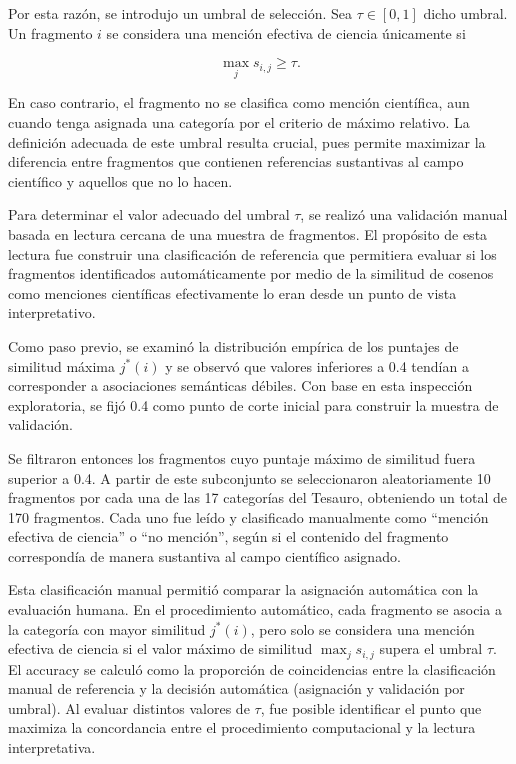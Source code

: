 \documentclass[11pt,a4paper]{article}
\begin{document}
Por esta razón, se introdujo un umbral de selección. Sea $\tau \in [0,1]$ dicho umbral. Un fragmento $i$ se considera una mención efectiva de ciencia únicamente si

\[
\max_{j} s_{i,j} \geq \tau.
\]

En caso contrario, el fragmento no se clasifica como mención científica, aun cuando tenga asignada una categoría por el criterio de máximo relativo. La definición adecuada de este umbral resulta crucial, pues permite maximizar la diferencia entre fragmentos que contienen referencias sustantivas al campo científico y aquellos que no lo hacen.

Para determinar el valor adecuado del umbral $\tau$, se realizó una validación manual basada en lectura cercana de una muestra de fragmentos. El propósito de esta lectura fue construir una clasificación de referencia que permitiera evaluar si los fragmentos identificados automáticamente por medio de la similitud de cosenos como menciones científicas efectivamente lo eran desde un punto de vista interpretativo.

Como paso previo, se examinó la distribución empírica de los puntajes de similitud máxima $j^*(i)$ y se observó que valores inferiores a 0.4 tendían a corresponder a asociaciones semánticas débiles. Con base en esta inspección exploratoria, se fijó 0.4 como punto de corte inicial para construir la muestra de validación.

Se filtraron entonces los fragmentos cuyo puntaje máximo de similitud fuera superior a 0.4. A partir de este subconjunto se seleccionaron aleatoriamente 10 fragmentos por cada una de las 17 categorías del Tesauro, obteniendo un total de 170 fragmentos. Cada uno fue leído y clasificado manualmente como “mención efectiva de ciencia” o “no mención”, según si el contenido del fragmento correspondía de manera sustantiva al campo científico asignado.

Esta clasificación manual permitió comparar la asignación automática con la evaluación humana. En el procedimiento automático, cada fragmento se asocia a la categoría con mayor similitud $j^*(i)$, pero solo se considera una mención efectiva de ciencia si el valor máximo de similitud $\max_j s_{i,j}$ supera el umbral $\tau$. El accuracy se calculó como la proporción de coincidencias entre la clasificación manual de referencia y la decisión automática (asignación y validación por umbral). Al evaluar distintos valores de $\tau$, fue posible identificar el punto que maximiza la concordancia entre el procedimiento computacional y la lectura interpretativa.
\end{document}
